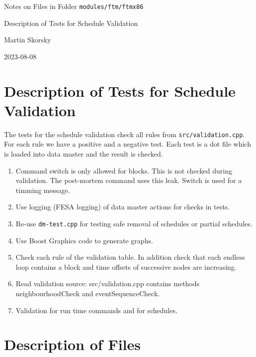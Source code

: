 \documentclass[12pt,a4paper]{report}
\begin{document}
\begin{titlepage}
\vspace{2cm}
\begin{center}
\Huge{Notes on Files in Folder \texttt{modules/ftm/ftmx86}}

\Huge{Description of Tests for Schedule Validation}

\Large{Martin Skorsky}

\Large{2023-08-08}
\end{center}
\vfill
\end{titlepage}

\tableofcontents

\chapter{Description of Tests for Schedule Validation}
The tests for the schedule validation check all rules from \texttt{src/validation.cpp}. For each rule we have a positive and a negative test. Each test is a dot file which is loaded into data master and the result is checked.

\begin{enumerate}
    \item Command switch is only allowed for blocks. This is not checked during validation. The post-mortem command uses this leak. Switch is used for a timming message.
    \item Use logging (FESA logging) of data master actions for checks in tests.
    \item Re-use \texttt{dm-test.cpp} for testing safe removal of schedules or partial schedules.
    \item Use Boost Graphics code to generate graphs.
    \item Check each rule of the validation table. In addition check that each endless loop contains a block and time offsets of successive nodes are increasing.
    \item Read validation source: src/validation.cpp contains methods neighbourhoodCheck and eventSequenceCheck.
    \item Validation for run time commands and for schedules.
\end{enumerate}

\chapter{Description of Files}
\end{document}
